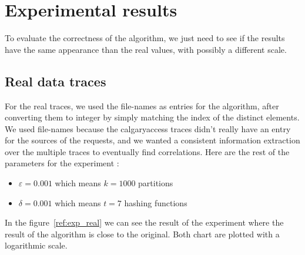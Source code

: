 \documentclass[a4paper]{article}%
\begin{document}
\section{Experimental results}

To evaluate the correctness of the algorithm, we just need to see if the results have the same appearance than the real values, with possibly a different scale.

\subsection{Real data traces}


For the real traces, we used the file-names as entries for the algorithm, after converting them to integer by simply matching the index of the distinct elements. We used file-names because the calgaryaccess traces didn't really have an entry for the sources of the requests, and we wanted a consistent information extraction over the multiple traces to eventually find correlations. Here are the rest of the parameters for the experiment :


\begin{itemize}
	\item $\varepsilon = 0.001$ which means $k = 1000$ partitions
	\item $\delta = 0.001$ which means $t = 7$ hashing functions
\end{itemize}

In the figure~\ref{ref:exp_real} we can see the result of the experiment where the result of the algorithm is close to the original. Both chart are plotted with a logarithmic scale.
\end{document}
